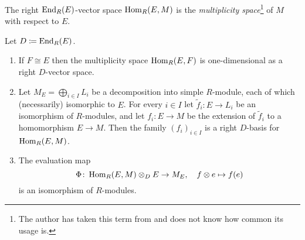\begin{definition}
  The right $\operatorname{End}_R(E)$-vector space $\operatorname{Hom}_R(E,M)$ is the \emph{multiplicity space}\footnote{
  The author has taken this term from \cite{AP2012DoubleCommutant} and does not know how common its usage is.
  } of $M$ with respect to $E$.
\end{definition}


\begin{proposition}
  \label{proposition: multiplicity spaces}
    Let $D \coloneqq \operatorname{End}_R(E)$.
    \begin{enumerate}
    \item
      \label{enumerate: one-dimensional as D vector space}
      If $F \cong E$ then the multiplicity space $\operatorname{Hom}_R(E,F)$ is one-dimensional as a right $D$-vector space.
    \item
      \label{enumerate: basis of multiplicity space}
      Let $M_E = \bigoplus_{i \in I} L_i$ be a decomposition into simple $R$-module, each of which (necessarily) isomorphic to $E$.
      For every $i \in I$ let $\tilde{f}_i \colon E \to L_i$ be an isomorphism of $R$-modules, and let $f_i \colon E \to M$ be the extension of $\tilde{f}_i$ to a homomorphism $E \to M$.
      Then the family $(f_i)_{i \in I}$ is a right $D$-basis for $\operatorname{Hom}_R(E,M)$.
    \item
      The evaluation map
      \[
                \Phi
        \colon  \operatorname{Hom}_R(E,M) \mathbin{\otimes}_D E
        \to     M_E,
        \quad   f \mathbin{\otimes} e
        \mapsto f(e)
      \]
      is an isomorphism of $R$-modules.
  \end{enumerate}
\end{proposition}


